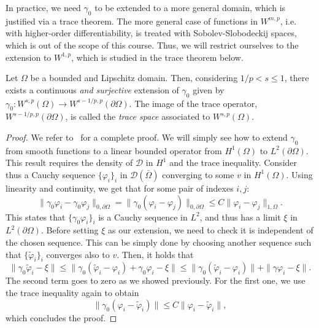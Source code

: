 In practice, we need $\gamma_0$ to be extended to a more general domain, which is justified via a trace theorem. The more general case of functions in $W^{m,p}$, i.e. with higher-order differentiability, is treated with Sobolev-Slobodeckij spaces, which is out of the scope of this course. Thus, we will restrict ourselves to the extension to $W^{1,p}$, which is studied in the trace theorem below.
\begin{theorem}\label{thm:trace-theorem}
    Let $\Omega$ be a bounded and Lipschitz domain. Then, considering $1/p < s \leq 1$, there exists a continuous \emph{and surjective} extension of $\gamma_0$ given by $\gamma_0: W^{s,p}(\Omega) \to W^{s-1/p, p}(\partial\Omega)$. The image of the trace operator, $W^{s-1/p, p}(\partial\Omega)$, is called the \emph{trace space} associated to $W^{s,p}(\Omega)$.
    \begin{proof}
        We refer to~\cite{adams2003sobolev} for a complete proof. We will simply see how to extend $\gamma_0$ from smooth functions to a linear bounded operator from $H^1(\Omega)$ to $L^2(\partial\Omega)$. This result requires the density of $\mathcal D$ in $H^1$ and the trace inequality. Consider thus a Cauchy sequence $\{\varphi_i\}_i$ in $\mathcal D(\bar\Omega)$ converging to some $v$ in $H^1(\Omega)$. Using linearity and continuity, we get that for some pair of indexes $i,j$: 
        \begin{equation*}
            \| \gamma_0 \varphi_i - \gamma_0 \varphi_j \|_{0,\partial\Omega} = \| \gamma_0 (\varphi_i - \varphi_j) \|_{0,\partial\Omega} \leq C \| \varphi_i - \varphi_j \|_{1,\Omega}.
        \end{equation*}
        This states that $\{ \gamma_0 \varphi_i \}_i $ is a Cauchy sequence in $L^2$, and thus has a limit $\xi$ in $L^2(\partial\Omega)$. Before setting $\xi$ as our extension, we need to check it is independent of the chosen sequence. This can be simply done by choosing another sequence such that $\{\tilde \varphi_i\}_i$ converges also to $v$. Then, it holds that 
        \begin{equation*}
            \| \gamma_0 \tilde \varphi_i - \xi \| \leq \| \gamma_0(\tilde\varphi_i - \varphi_i) + \gamma_0 \varphi_i - \xi \| \leq \| \gamma_0(\tilde\varphi_i - \varphi_i) \| + \| \gamma\varphi_i - \xi \|.
        \end{equation*}
        The second term goes to zero as we showed previously. For the first one, we use the trace inequality again to obtain 
        \begin{equation*}
            \| \gamma_0(\varphi_i - \tilde\varphi_i) \| \leq C \|\varphi_i - \tilde \varphi_i \|,
        \end{equation*}
        which concludes the proof. 
    \end{proof}
\end{theorem}

